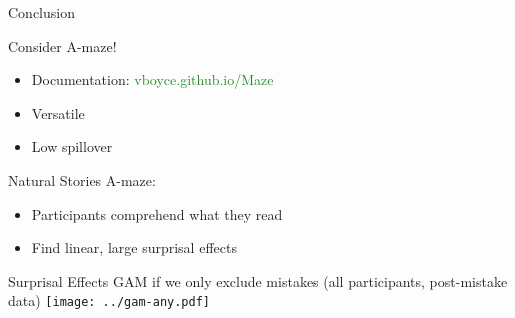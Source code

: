 \documentclass[12pt, xcolor=beamer,table,usenames,dvipsnames, ignorenonframetext, ngerman,t]{beamer}
\begin{document}
\begin{frame}{Conclusion}
	
	\pause
	
Consider A-maze! 
\begin{itemize}\pause
	\item Documentation:  \textcolor{ForestGreen}{vboyce.github.io/Maze} \pause
	\item Versatile \pause
	\item Low spillover \pause 
\end{itemize}

Natural Stories A-maze: \pause 
\begin{itemize}
	\item Participants comprehend what they read \pause
	\item Find linear, large surprisal effects
\end{itemize}

\end{frame}

\appendix


\begin{frame}{Surprisal Effects}
	GAM if we only exclude mistakes (all participants, post-mistake data)
	\texttt{[image: ../gam-any.pdf]}	
\end{frame}
\end{document}
